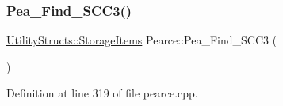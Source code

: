 \mbox{\label{class_pearce_a9d49726ab058f24cc943135458edb4f9}} 
\subsubsection{\texorpdfstring{Pea\+\_\+\+Find\+\_\+\+S\+C\+C3()}{Pea\_Find\_SCC3()}}
{\footnotesize\ttfamily \hyperlink{struct_utility_structs_1_1_storage_items}{Utility\+Structs\+::\+Storage\+Items} Pearce\+::\+Pea\+\_\+\+Find\+\_\+\+S\+C\+C3 (\begin{DoxyParamCaption}{ }\end{DoxyParamCaption})}



Definition at line 319 of file pearce.\+cpp.


